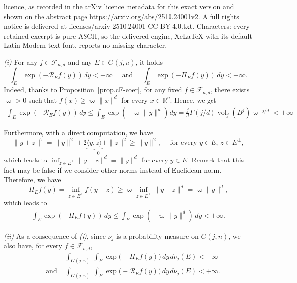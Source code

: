 \documentclass[10pt,a4paper]{amsart}
\DeclareMathOperator{\vol}{vol}
\newcommand{\R}{\mathbb{R}}
\newcommand{\cF}{\mathcal{F}}
\begin{document}
licence, as recorded in the arXiv licence metadata for this exact version and shown on the abstract page https://arxiv.org/abs/2510.24001v2. A full rights notice is delivered at licenses/arxiv-2510.24001-CC-BY-4.0.txt. Characters: every retained excerpt is pure ASCII, so the delivered engine, XeLaTeX with its default Latin Modern text font, reports no missing character.
\begin{remark}[Integrability]\label{rem:integrability}
\textit{(i)} For any $f\in \cF_{n,d}$ and any $E\in G(j,n)$, it holds
\[
  \int_E \exp(-\mathscr R_E f(y))\,dy < + \infty\quad \text{ and } \quad 
  \int_E \exp(-\Pi_E f(y))\,dy< +\infty.
\]
Indeed, thanks to Proposition~\ref{prop.cF-coer}, for any fixed $f \in \cF_{n, d}$, there exists $\varpi > 0$ such that $f(x) \geq \varpi \| x \|^d$ for every $x \in \R^n$.
Hence, we get
\begin{align*}
    \int_E \exp(- \mathscr R_E f(y)) \, dy \leq \int_E \exp( - \varpi \| y \|^d) \, dy = \frac{j }{d} \Gamma(j/d) \vol_j(B^j) \varpi^{-j/d} < + \infty
\end{align*}

Furthermore, with a direct computation, we have
\begin{equation*}
    \| y + z \|^2 = \| y \|^2 + 2 \underbrace{\langle y, z \rangle}_{\, = \, 0} + \| z \|^2 \geq \| y \|^2, \quad \text{ for every  } y \in E, \, z \in E^\perp,
\end{equation*}
which leads to $\textstyle\inf_{z \in E^\perp} \| y + z \|^d = \| y \|^d$ for every $y \in E$. 
Remark that this fact may be false if we consider other norms instead of Euclidean norm.
Therefore, we have
\[
    \Pi_E f(y) = \inf_{z \in E^\perp} f(y + z) \geq \varpi \inf_{z \in E^\perp} \| y + z \|^d = \varpi \| y \|^d,
\]
which leads to
\begin{align*}
    \int_E \exp( - \Pi_E f(y)) \, dy \leq \int_E \exp(- \varpi \| y \|^d) \, dy < +\infty.
\end{align*}

\medskip

\textit{(ii)}
As a consequence of \textit{(i)}, since $\nu_j$ is a probability measure on $G(j,n)$, we also have, for every $f \in \cF_{n, d}$,
\begin{align*}
	& \int_{G(j,n)} \ \int_{E} \exp\big(-\Pi_E f(y)\big)\,dy \, d\nu_j(E) < + \infty \\
    \quad \text{ and }   & \int_{G(j,n)} \ \int_{E} \exp\big(-\mathscr R_E f(y)\big)\,dy \, d\nu_j(E) < + \infty.
\end{align*}
\end{remark}
\end{document}
